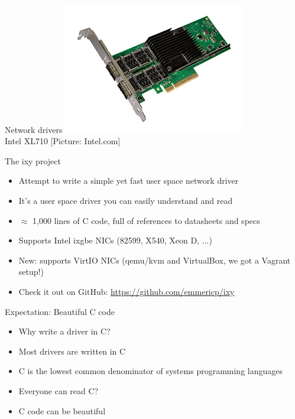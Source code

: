 \documentclass[NET,english,aspectratio=169,notitleframe]{tumbeamer}
\begin{document}
\begin{frame}{Network drivers}
\centering\includegraphics[width=0.60\textwidth]{pics/nic3}\\
\vspace{-1em}\tiny{Intel XL710 [Picture: Intel.com]}
\end{frame}

\begin{frame}{The ixy project}
\begin{itemize}
\item Attempt to write a simple yet fast user space network driver
\item It's a user space driver you can easily understand and read
\item $\approx$ 1,000 lines of C code, full of references to datasheets and specs
\item Supports Intel ixgbe NICs (82599, X540, Xeon D, ...)
\item New: supports VirtIO NICs (qemu/kvm and VirtualBox, we got a Vagrant setup!)
\item Check it out on GitHub: \url{https://github.com/emmericp/ixy}
\end{itemize}
\end{frame}


\begin{frame}{Expectation: Beautiful C code}
\begin{itemize}
\item Why write a driver in C?
\pause
\vspace{1em}
\item Most drivers are written in C
\item C is the lowest common denominator of systems programming languages
\item Everyone can read C?
\item C code can be beautiful
\end{itemize}
\end{frame}
\end{document}
